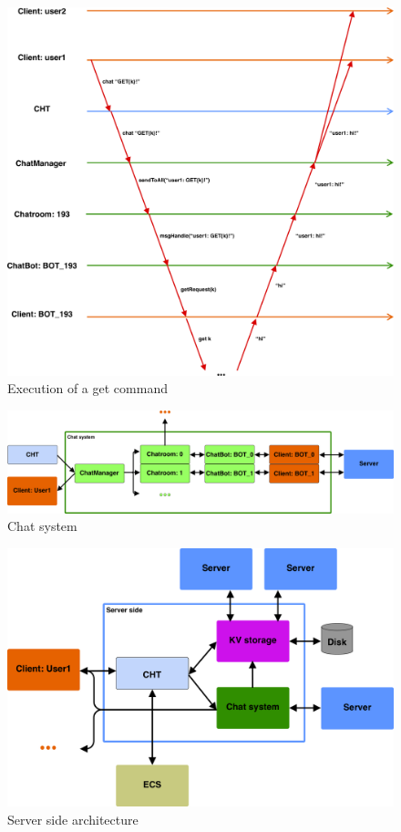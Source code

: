 \begin{figure}[h]
	\centering
	\includegraphics[width=\linewidth]{figures/chat/chat_graph.png}
	\caption{Execution of a get command}
\end{figure}

\begin{figure}[h]
	\centering
	\includegraphics[width=\linewidth]{figures/chat/chat_arch.png}
	\caption{Chat system}
\end{figure}

\begin{figure}[h]
	\centering
	\includegraphics[width=\linewidth]{figures/chat/chat_full_arch.png}
	\caption{Server side architecture}
\end{figure}

